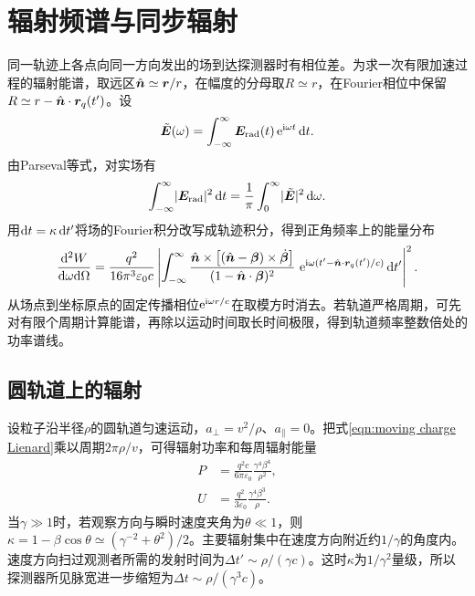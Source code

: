 \section{辐射频谱与同步辐射}

同一轨迹上各点向同一方向发出的场到达探测器时有相位差。为求一次有限加速过程的辐射能谱，取远区$\mathop{}\!\hat{\bm{n}} \simeq \bm r/r$，在幅度的分母取$R \simeq r$，在Fourier相位中保留$R \simeq r - \mathop{}\!\hat{\bm{n}} \cdot \bm r_q(t')$。设
\[
    \tilde{\bm E}(\omega) = \int_{-\infty}^\infty\bm E_\mathrm{rad}(t)\mathop{}\!\mathrm{e}^{\mathrm{i}\omega t}\mathop{}\!\mathrm{d} t.
\]
由Parseval等式，对实场有
\[
    \int_{-\infty}^\infty\lvert\bm E_\mathrm{rad}\rvert^2\mathop{}\!\mathrm{d} t = \frac1\pi\int_0^\infty\lvert\tilde{\bm E}\rvert^2\mathop{}\!\mathrm{d}\omega.
\]
用$\mathop{}\!\mathrm{d} t = \kappa\mathop{}\!\mathrm{d} t'$将场的Fourier积分改写成轨迹积分，得到正角频率上的能量分布
\begin{equation}
    \frac{\mathop{}\!\mathrm{d}^2 W}{\mathrm{d}\omega\mathrm{d}\Omega}
    = \frac{q^2}{16\pi^3\varepsilon_0c}\left|
        \int_{-\infty}^\infty\frac{\mathop{}\!\hat{\bm{n}} \times \bigl[(\mathop{}\!\hat{\bm{n}} - \bm\beta) \times \dot{\bm{\beta}}\bigr]}{(1 - \mathop{}\!\hat{\bm{n}} \cdot \bm\beta)^2}
        \,\mathop{}\!\mathrm{e}^{\mathrm{i}\omega(t'-\mathop{}\!\hat{\bm{n}}\cdot\bm r_q(t')/c)}\mathop{}\!\mathrm{d} t'
    \right|^2.
    \label{eqn:moving charge spectrum}
\end{equation}
从场点到坐标原点的固定传播相位$\mathop{}\!\mathrm{e}^{\mathrm{i}\omega r/c}$在取模方时消去。若轨道严格周期，可先对有限个周期计算能谱，再除以运动时间取长时间极限，得到轨道频率整数倍处的功率谱线。

\subsection{圆轨道上的辐射}

设粒子沿半径$\rho$的圆轨道匀速运动，$a_\perp = v^2/\rho$、$a_\parallel = 0$。把式\eqref{eqn:moving charge Lienard}乘以周期$2\pi\rho/v$，可得辐射功率和每周辐射能量
\begin{subequations}
    \begin{align}
        P &= \frac{q^2c}{6\pi\varepsilon_0}\frac{\gamma^4\beta^4}{\rho^2},\\
        U &= \frac{q^2}{3\varepsilon_0}\frac{\gamma^4\beta^3}{\rho}.
    \end{align}
\end{subequations}
当$\gamma \gg 1$时，若观察方向与瞬时速度夹角为$\theta \ll 1$，则$\kappa = 1 - \beta\cos\theta \simeq (\gamma^{-2} + \theta^2)/2$。主要辐射集中在速度方向附近约$1/\gamma$的角度内。速度方向扫过观测者所需的发射时间为$\Delta t' \sim \rho/(\gamma c)$。这时$\kappa$为$1/\gamma^2$量级，所以探测器所见脉宽进一步缩短为$\Delta t \sim \rho/(\gamma^3c)$。

